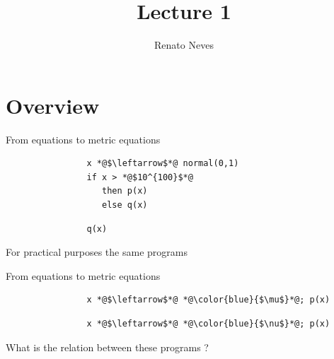 \documentclass{beamer}
\author[Renato Neves]{Renato Neves}
\date{}
\begin{document}
\title{Lecture 1}

\frame[plain]{\titlepage}

\section{Overview}

\begin{frame}[fragile]{From equations to metric equations}
     
        \hspace{-1cm}
        \begin{minipage}{0.53\textwidth}
        \begin{lstlisting}
                x *@$\leftarrow$*@ normal(0,1)
                if x > *@$10^{100}$*@
                   then p(x)
                   else q(x)
        \end{lstlisting}
        \end{minipage}
        \begin{minipage}{0.45\textwidth}
        \begin{lstlisting}
                q(x)
        \end{lstlisting}
        \end{minipage}

        \bigskip
        \bigskip
        For practical purposes the same programs
\end{frame}

\begin{frame}[fragile]{From equations to metric equations}
     
        \hspace{-1.5cm}
        \begin{minipage}{0.50\textwidth}
        \begin{lstlisting}
                x *@$\leftarrow$*@ *@\color{blue}{$\mu$}*@; p(x)
        \end{lstlisting}
        \end{minipage}
        \begin{minipage}{0.50\textwidth}
        \begin{lstlisting}
                x *@$\leftarrow$*@ *@\color{blue}{$\nu$}*@; p(x)
        \end{lstlisting}
        \end{minipage}

        \bigskip
        \bigskip
        What is the relation between these programs ?
\end{frame}
\end{document}
